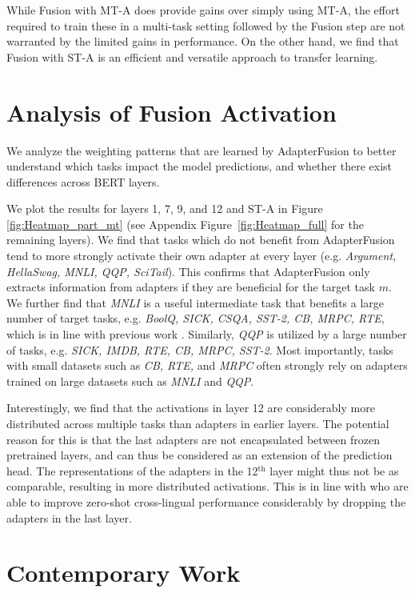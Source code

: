 While Fusion with MT-A does provide gains over simply using MT-A, the effort required to train these in a multi-task setting followed by the Fusion step are not warranted by the limited gains in performance. On the other hand, we find that Fusion with ST-A is an efficient and versatile approach to transfer learning.

\section{Analysis of Fusion Activation} 
\label{analysis}

We analyze the weighting patterns that are learned by AdapterFusion to better understand which tasks impact the model predictions, and whether there exist differences across BERT layers.

We plot the results for layers 1, 7, 9, and 12 and ST-A in Figure \ref{fig:Heatmap_part_mt} (see Appendix Figure~\ref{fig:Heatmap_full} for the remaining layers). We find that tasks which do not benefit from AdapterFusion tend to more strongly activate their own adapter at every layer (e.g. \textit{Argument, HellaSwag, MNLI, QQP, SciTail}). This confirms that AdapterFusion only extracts information from adapters if they are beneficial for the target task $m$. We further find that \textit{MNLI} is a useful intermediate task that benefits a large number of target tasks, e.g. \textit{BoolQ, SICK, CSQA, SST-2, CB, MRPC, RTE}, which is in line with previous work \cite{phang2018sentence, conneau2018senteval, reimers-gurevych-2019-sentence}. Similarly, \textit{QQP} is utilized by a large number of tasks, e.g. \textit{SICK, IMDB, RTE, CB, MRPC, SST-2}. Most importantly, tasks with small datasets such as \textit{CB, RTE,} and \textit{MRPC} often strongly rely on adapters trained on large datasets such as  \textit{MNLI} and \textit{QQP}. 

Interestingly, we find that the activations in layer 12 are considerably more distributed across multiple tasks than adapters in earlier layers. The potential reason for this is that the last adapters are not encapsulated between frozen pretrained layers, and can thus be considered as an extension of the prediction head. The representations of the adapters in the 12$^\text{th}$ layer  might thus not be as comparable, resulting in more distributed activations. This is in line with \citet{Pfeiffer20Gib} who are able to improve zero-shot cross-lingual performance considerably by dropping the adapters in the last layer. 

\section{Contemporary Work}

